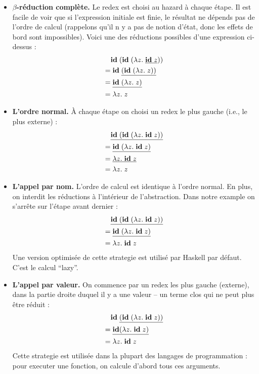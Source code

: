 \begin{itemize}
	\item \textbf{$\beta$-réduction complète.}
		Le redex est choisi au hazard à chaque étape. Il est facile de voir que si l'expression initiale est finie, le résultat ne dépends pas de l'ordre de calcul (rappelons qu'il n y a pas de notion d'état, donc les effets de bord sont impossibles).
		Voici une des réductions possibles d'une expression ci-dessus :
		\begin{align*}
			& \mathbf{id} \; (\mathbf{id} \; (\lambda z. \; \underline{\mathbf{id} \; z})) \\
			= & \; \mathbf{id} \; \underline{(\mathbf{id} \; (\lambda z. \; z))} \\
			= & \; \underline{\mathbf{id} \; (\lambda z. \; z)} \\
			= & \; \lambda z. \; z
		\end{align*}
	\item \textbf{L'ordre normal.}
		À chaque étape on choisi un redex le plus gauche (i.e., le plus externe) :
		\begin{align*}
			& \underline{\mathbf{id} \; (\mathbf{id} \; (\lambda z. \; \mathbf{id} \; z))} \\
			= & \; \underline{\mathbf{id} \; (\lambda z. \; \mathbf{id} \; z)} \\
			= & \; \underline{\lambda z. \; \mathbf{id} \; z} \\
			= & \; \lambda z. \; z
		\end{align*}		
	\item \textbf{L'appel par nom.}
		L'ordre de calcul est identique à l'ordre normal. En plus, on interdit les réductions à l'intérieur de l'abstraction. Dans notre example on s'arrête sur l'étape avant dernier :
		\begin{align*}
			& \underline{\mathbf{id} \; (\mathbf{id} \; (\lambda z. \; \mathbf{id} \; z))} \\
			= & \; \underline{\mathbf{id} \; (\lambda z. \; \mathbf{id} \; z)} \\
			= & \; \lambda z. \; \mathbf{id} \; z
		\end{align*}
		Une version optimisée de cette strategie est utilisé par Haskell par défaut.
		C'est le calcul ``lazy''.
	\item \textbf{L'appel par valeur.}
		On commence par un redex les plus gauche (externe), dans la partie droite duquel il y a une valeur -- un terme clos qui ne peut plus être réduit :
		\begin{align*}
			& \mathbf{id} \; \underline{(\mathbf{id} \; (\lambda z. \; \mathbf{id} \; z))} \\
			= & \; \underline{\mathbf{id} (\lambda z. \; \mathbf{id} \; z)} \\
			= & \; \lambda z. \; \mathbf{id} \; z
		\end{align*}
		Cette strategie est utilisée dans la plupart des langages de programmation : pour executer une fonction, on calcule d'abord tous ces arguments.
\end{itemize}
